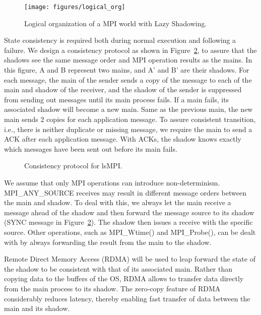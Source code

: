 \begin{figure}[!t]
  \begin{center}
      \texttt{[image: figures/logical\_org]}
  \end{center}
  \caption{Logical organization of a MPI world with Lazy Shadowing.}
  \label{fig:logical_con}
\end{figure}

State consistency is required both during normal execution and following a failure. %
We design a consistency protocol as shown in Figure~\ref{fig:cons_protocol}, 
to assure 
that the shadows see the same message order and MPI operation results as the mains. In this figure, A and B represent two mains, and A' and B' are their shadows. 
For each message, the main of the sender sends a copy of the message to each of the main and shadow of the receiver, and the shadow of the sender is suppressed from sending out messages until its main process fails. %
If a main fails,
its associated shadow will become a new main. Same as the previous main, the new main sends 2 copies for each application message. 
To assure consistent transition, i.e., there is neither duplicate or missing message, we require the main to send a ACK after each application message. With ACKs, the shadow knows exactly which messages have been sent out before its main fails. 


\begin{figure}[!t]
  \begin{center}
  \end{center}
  \caption{Consistency protocol for lsMPI.}
  \label{fig:cons_protocol}
\end{figure}

We assume that only MPI operations can introduce non-determinism. MPI\_ANY\_SOURCE receives may result in different message orders between the main and shadow. To deal with this, we always let the main receive a message ahead of the shadow and then forward the message source to its shadow (SYNC message in Figure~\ref{fig:cons_protocol}). 
The shadow then issues a receive with the specific source. Other operations, such as MPI\_Wtime() and MPI\_Probe(), can be dealt with by always forwarding the result from the main to the shadow.

Remote Direct Memory Access (RDMA) will be used to leap forward the state of the shadow to be consistent with that of its associated main. Rather than copying data to the buffers of the OS, RDMA allows to transfer data directly from the main process to its shadow. The zero-copy feature of RDMA considerably reduces latency, thereby enabling fast transfer of data between the main and its shadow.
